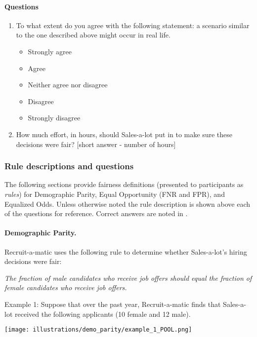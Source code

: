 \documentclass{article}
\newcommand{\correct}[1]{{\color{red}{#1}}}
\newcommand{\correct}[1]{{\color{red}{#1}}}
\begin{document}
\paragraph{Questions}
\begin{enumerate}
    \vspace{-5pt}
    \item To what extent do you agree with the following statement: a scenario similar to the one described above might occur in real life.
    \begin{itemize}
        \item Strongly agree
        \item Agree
        \item Neither agree nor disagree
        \item Disagree
        \item Strongly disagree
    \end{itemize}

    \item How much effort, in hours, should Sales-a-lot put in to make sure these decisions were fair? [short answer - number of hours]
\end{enumerate}

\subsubsection{Rule descriptions and questions}\label{app:st2_fairness}
The following sections provide fairness definitions (presented to participants as \emph{rules}) for Demographic Parity, Equal Opportunity (FNR and FPR), and Equalized Odds. Unless otherwise noted the rule description is shown above each of the questions for reference. Correct answers are noted in \correct{red}.

\paragraph{Demographic Parity.}

Recruit-a-matic uses the following rule to determine whether Sales-a-lot’s hiring decisions were fair:
 
\emph{The fraction of male candidates who receive job offers should equal the fraction of female candidates who receive job offers.}

Example 1: Suppose that over the past year, Recruit-a-matic finds that Sales-a-lot received the following applicants (10 female and 12 male).

\texttt{[image: illustrations/demo\_parity/example\_1\_POOL.png]}
\end{document}
